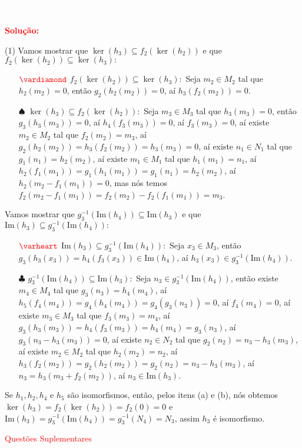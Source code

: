 \documentclass[11pt,a4paper]{article}
\newcommand{\dividiritens}[1]{\begin{tasks}[counter-format={(tsk[a])},label-width=3.6ex, label-format = {\bfseries}, column-sep = {0pt}](1) #1 \end{tasks}}
\newcommand{\pers}[1]{\textcolor{Floresta}{$\negrito{(#1)} $}}
\newcommand{\solucao}[1]{
\textbf{\textcolor{white}{oi}\\ \\ \textcolor{red}{Solução:}} #1}
\begin{document}
\solucao{
\dividiritens{
\task[\pers{a}] Vamos mostrar que $\ker(h_3) \subseteq f_2(\ker(h_2))$ e que $f_2(\ker(h_2)) \subseteq \ker(h_3):$
\begin{itemize}
    \item[$\textcolor{red}{\vardiamond}$] $f_2(\ker(h_2)) \subseteq \ker(h_3):$ Seja $m_2\in M_2$ tal que $h_2(m_2)=0$, então $g_2(h_2(m_2))=0$, aí $h_3(f_2(m_2))=0$. 
    
    \item[$\spadesuit$] $\ker(h_3) \subseteq f_2(\ker(h_2)):$ Seja $m_3\in M_3$ tal que $h_3(m_3)=0$, então $g_3(h_3(m_3))=0$, aí $h_4(f_3(m_3))=0$, aí $f_3(m_3)=0$, aí existe $m_2\in M_2$ tal que $f_2(m_2)=m_3$, aí $g_2(h_2(m_2))=h_3(f_2(m_2))=h_3(m_3)=0$, aí existe $n_1\in N_1$ tal que $g_1(n_1)=h_2(m_2)$, aí existe $m_1\in M_1$ tal que $h_1(m_1)=n_1$, aí $h_2(f_1(m_1))=g_1(h_1(m_1))=g_1(n_1)=h_2(m_2)$, aí $h_2(m_2-f_1(m_1))=0$, mas nós temos $f_2(m_2-f_1(m_1))=f_2(m_2)-f_2(f_1(m_1))=m_3$.
\end{itemize}
\task[\pers{b}] Vamos mostrar que $g_3^{-1}(\mbox{Im}(h_4)) \subseteq \mbox{Im}(h_3)$ e que $\mbox{Im}(h_3) \subseteq g_3^{-1}(\mbox{Im}(h_4)):$
\begin{itemize}
    \item[$\textcolor{red}{\varheart}$] $\mbox{Im}(h_3) \subseteq g_3^{-1}(\mbox{Im}(h_4)):$ Seja $x_3\in M_3$, então $g_3(h_3(x_3))=h_4(f_3(x_3))\in\mathrm{Im}(h_4)$, aí $h_3(x_3)\in g_3^{-1}(\mbox{Im}(h_4))$.
    
    \item[$\clubsuit$] $g_3^{-1}(\mbox{Im}(h_4)) \subseteq \mbox{Im}(h_3):$ Seja $n_3\in g_3^{-1}(\mbox{Im}(h_4))$, então existe $m_4\in M_4$ tal que $g_3(n_3)=h_4(m_4)$, aí $h_5(f_4(m_4))=g_4(h_4(m_4))=g_4(g_3(n_3))=0$, aí $f_4(m_4)=0$, aí existe $m_3\in M_3$ tal que $f_3(m_3)=m_4$, aí $g_3(h_3(m_3))=h_4(f_3(m_3))=h_4(m_4)=g_3(n_3)$, aí $g_3(n_3-h_3(m_3))=0$, aí existe $n_2\in N_2$ tal que $g_2(n_2)=n_3-h_3(m_3)$, aí existe $m_2\in M_2$ tal que $h_2(m_2)=n_2$, aí $h_3(f_2(m_2))=g_2(h_2(m_2))=g_2(n_2)=n_3-h_3(m_3)$, aí $n_3=h_3(m_3+f_2(m_2))$, aí $n_3\in\mathrm{Im}(h_3)$.
\end{itemize}
\task[\pers{c}] Se $h_1, h_2, h_4$ e $h_5$ são isomorfismos, então, pelos itens (a) e (b), nós obtemos $\ker(h_3) = f_2(\ker(h_2))=f_2(0)=0$ e $\mbox{Im}(h_3) = g_3^{-1}(\mbox{Im}(h_4))=g_3^{-1}(N_4)=N_3$, assim $h_3$ é isomorfismo.
}
}

\textcolor{Red}{Questões Suplementares}
\end{document}
